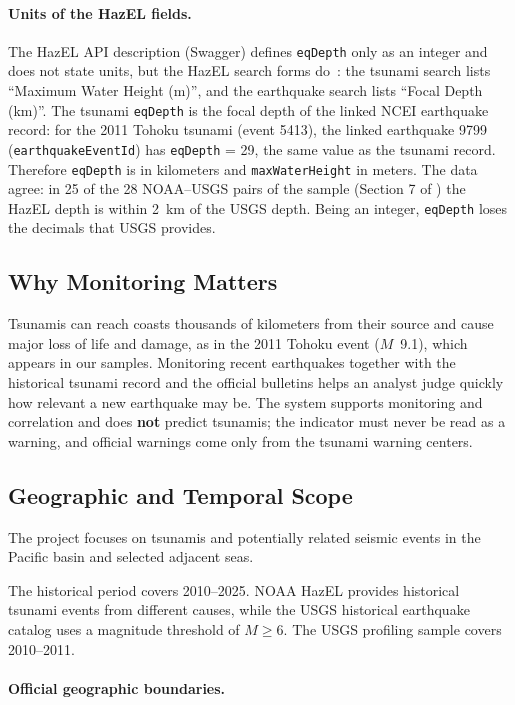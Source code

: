 \documentclass[a4paper,11pt,oneside]{book}
\begin{document}
\paragraph{Units of the HazEL fields.}
The HazEL API description (Swagger) defines \texttt{eqDepth} only as an integer and does not state units, but the HazEL search forms do~\cite{hazelforms}: the tsunami search lists ``Maximum Water Height (m)'', and the earthquake search lists ``Focal Depth (km)''.
The tsunami \texttt{eqDepth} is the focal depth of the linked NCEI earthquake record: for the 2011 Tohoku tsunami (event 5413), the linked earthquake 9799 (\texttt{earthquakeEventId}) has \texttt{eqDepth} = 29, the same value as the tsunami record.
Therefore \texttt{eqDepth} is in kilometers and \texttt{maxWaterHeight} in meters.
The data agree: in 25 of the 28 NOAA--USGS pairs of the sample (Section 7 of ) the HazEL depth is within 2~km of the USGS depth.
Being an integer, \texttt{eqDepth} loses the decimals that USGS provides.

\subsection{Why Monitoring Matters}
Tsunamis can reach coasts thousands of kilometers from their source and cause major loss of life and damage, as in the 2011 Tohoku event ($M$~9.1), which appears in our samples.
Monitoring recent earthquakes together with the historical tsunami record and the official bulletins helps an analyst judge quickly how relevant a new earthquake may be.
The system supports monitoring and correlation and does \textbf{not} predict tsunamis; the indicator must never be read as a warning, and official warnings come only from the tsunami warning centers.

\subsection{Geographic and Temporal Scope}

The project focuses on tsunamis and potentially related seismic
events in the Pacific basin and selected adjacent seas.

The historical period covers 2010--2025. NOAA HazEL provides
historical tsunami events from different causes, while the USGS
historical earthquake catalog uses a magnitude threshold of
$M \geq 6$. The USGS profiling sample covers 2010--2011.

\paragraph{Official geographic boundaries.}
\end{document}
